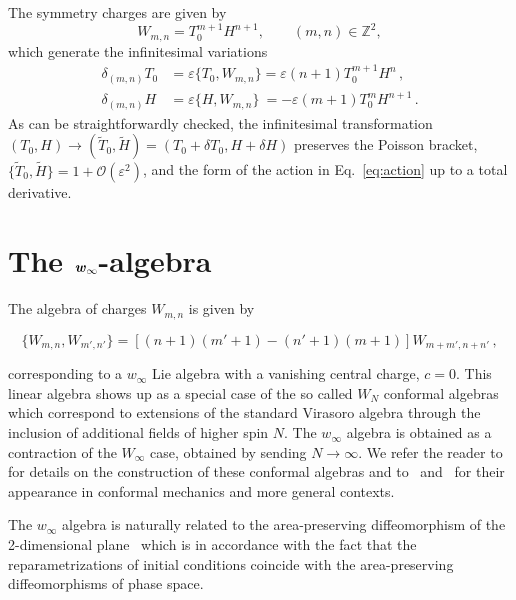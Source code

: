 \documentclass[twocolumn,notitlepage,superscriptaddress, nofootinbib,nobibnotes, aps,prd,10pt]{revtex4-1}%
\begin{document}
The symmetry charges are given by
%
\begin{equation}
W_{m,n} = T_0^{m+1}H^{n+1},\qquad (m,n)\in\mathbb{Z}^2,
\end{equation}
%
which generate the infinitesimal variations
%
\begin{subequations}
\begin{align}
\delta_{(m,n)} T_0 &= \varepsilon\{T_0,W_{m,n}\} = \varepsilon(n+1)T_0^{m+1}H^n\, ,\\[7pt]
\delta_{(m,n)} H &= \varepsilon\{H,W_{m,n}\} \:= -\varepsilon(m+1)T_0^mH^{n+1}\, .
\end{align}
\end{subequations}
%
As can be straightforwardly checked, the infinitesimal transformation $(T_0,H)\rightarrow(\tilde{T}_0,\tilde{H}) = (T_0+\delta T_0, H+\delta H)$ preserves the Poisson bracket, $\{\tilde{T}_0,\tilde{H}\} = 1+\mathcal{O}(\varepsilon^2)$, and the form of the action in Eq.~\eqref{eq:action} up to a total derivative. 

\section{The $\text{\textbf{\textit{w}}}_{\mathbf{\infty}}$-algebra}

The algebra of charges $W_{m,n}$ is given by
%
\begin{widetext}
\begin{equation}\label{eq:w algebra}
 \{ W_{m,n}, W_{m',n'} \}  = \left[ (n+1)(m'+1) - (n'+1)(m+1)\right] W_{m+m', n+n'} \, ,
\end{equation}
\end{widetext}
%
corresponding to a $w_{\infty}$ Lie algebra with a vanishing central charge, $c=0$. This linear algebra shows up as a special case of the so called $W_{N}$ conformal algebras which correspond to extensions of the standard Virasoro algebra through the inclusion of additional fields of higher spin $N$. The $w_{\infty}$ algebra is obtained as a contraction of the $W_{\infty}$ case, obtained by sending $N \rightarrow \infty$. We refer the reader to~\cite{Pope:1991ig,Bakas:1989mz,Bakas:1990sh} for details on the construction of these conformal algebras and to~\cite{Kumar:1999fx,Cacciatori:1999rp} and~\cite{Mignemi:2000cv} for their appearance in conformal mechanics and more general contexts. 

The $w_{\infty}$ algebra is naturally related to the area-preserving diffeomorphism of the 2-dimensional plane~\cite{Bakas:1989mz} which is in accordance with the fact that the reparametrizations of initial conditions coincide with the area-preserving diffeomorphisms of phase space.
\end{document}
